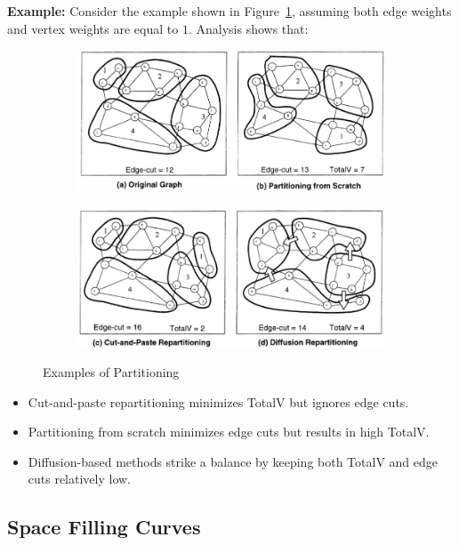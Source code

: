 \documentclass[12pt]{book}
\begin{document}
\textbf{Example:} Consider the example shown in Figure~\ref{fig:examppart}, assuming both edge weights and vertex weights are equal to $1$. Analysis shows that:
\begin{figure}[ht]
    \centering
    \begin{subfigure}[b]{0.65\linewidth}
        \centering
        \includegraphics[width=\linewidth]{images/schemediff.png}
    \end{subfigure}
    \hfill
    \begin{subfigure}[b]{0.65\linewidth}
        \centering
        \includegraphics[width=\linewidth]{images/exampparti.png}
    \end{subfigure}
    \caption{Examples of Partitioning}
    \label{fig:examppart}
\end{figure}
\begin{itemize}
    \item Cut-and-paste repartitioning minimizes TotalV but ignores edge cuts. 
    \item Partitioning from scratch minimizes edge cuts but results in high TotalV. 
    \item Diffusion-based methods strike a balance by keeping both TotalV and edge cuts relatively low.
\end{itemize}


\subsection{Space Filling Curves}
\end{document}
